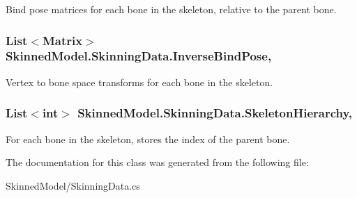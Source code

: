 Bind pose matrices for each bone in the skeleton, relative to the parent bone. 

\hypertarget{class_skinned_model_1_1_skinning_data_a480419d9a7614d8e72b95e694d9ce908}{
\subsubsection[{Inverse\+Bind\+Pose}]{\setlength{\rightskip}{0pt plus 5cm}List$<$Matrix$>$ Skinned\+Model.\+Skinning\+Data.\+Inverse\+Bind\+Pose\hspace{0.3cm}{\ttfamily [get]}, {\ttfamily [set]}}}\label{class_skinned_model_1_1_skinning_data_a480419d9a7614d8e72b95e694d9ce908}


Vertex to bone space transforms for each bone in the skeleton. 

\hypertarget{class_skinned_model_1_1_skinning_data_a83e303f9faee1c4c121897106a450f30}{
\subsubsection[{Skeleton\+Hierarchy}]{\setlength{\rightskip}{0pt plus 5cm}List$<$int$>$ Skinned\+Model.\+Skinning\+Data.\+Skeleton\+Hierarchy\hspace{0.3cm}{\ttfamily [get]}, {\ttfamily [set]}}}\label{class_skinned_model_1_1_skinning_data_a83e303f9faee1c4c121897106a450f30}


For each bone in the skeleton, stores the index of the parent bone. 



The documentation for this class was generated from the following file\+:\begin{DoxyCompactItemize}
\item 
Skinned\+Model/Skinning\+Data.\+cs\end{DoxyCompactItemize}
